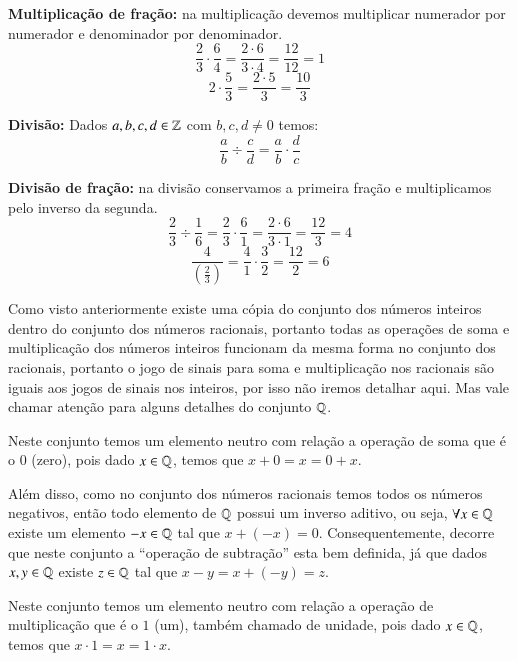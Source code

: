  \vskip0.3cm
 \begin{exem}
  \textbf{Multiplicação de fração:} na multiplicação devemos multiplicar numerador por numerador e denominador por denominador.
   \[\frac{2}{3} \cdot \frac{6}{4}= \frac{2 \cdot 6}{3 \cdot 4}= \frac{12}{12}= 1 \]
   \[2 \cdot \frac{5}{3}= \frac{2 \cdot 5}{3}= \frac{10}{3}\]
 \end{exem}

 \vskip0.3cm

 \colorbox{azul}{
 \begin{minipage}{0.9\linewidth}
 \begin{center}
  \textbf{Divisão:} Dados $a, b, c, d \in \mathbb{Z}$ com $b, c, d \neq 0$ temos:
 \[\frac{a}{b} \div \frac{c}{d}= \frac{a}{b} \cdot \frac{d}{c} \]
 \end{center}
 \end{minipage}}

 \vskip0.3cm
 \begin{exem}
  \textbf{Divisão de fração:} na divisão conservamos a primeira fração e multiplicamos pelo inverso da segunda.
   \[\frac{2}{3} \div \frac{1}{6}= \frac{2}{3} \cdot \frac{6}{1}= \frac{2 \cdot 6}{3 \cdot 1}= \frac{12}{3}= 4 \]
   \[\frac{4}{\left(\frac{2}{3}\right)}= \frac{4}{1} \cdot \frac{3}{2}= \frac{12}{2}=6\]
 \end{exem}

 Como visto anteriormente existe uma cópia do conjunto dos números inteiros dentro do conjunto dos números racionais, portanto todas as operações de soma e multiplicação dos números inteiros funcionam da mesma forma no conjunto dos racionais, portanto o jogo de sinais para soma e multiplicação nos racionais são iguais aos jogos de sinais nos inteiros, por isso não iremos detalhar aqui. Mas vale chamar atenção para alguns detalhes do conjunto $\mathbb{Q}$.
 
   Neste conjunto temos um elemento neutro com relação a operação de soma que é o $0$ (zero), pois dado $x \in \mathbb{Q}$, temos que $x+0= x= 0+x$.
 
 Além disso, como no conjunto dos números racionais temos todos os números negativos, então todo elemento de $\mathbb{Q}$ possui um inverso aditivo, ou seja, $\forall x \in \mathbb{Q}$ existe um elemento $-x \in \mathbb{Q}$ tal que $x + (-x)=0$. Consequentemente, decorre que neste conjunto a ``operação de subtração'' esta bem definida, já que dados $x, y \in \mathbb{Q}$ existe $z \in \mathbb{Q}$ tal que $x - y= x+ (-y)= z$.
 
 Neste conjunto temos um elemento neutro com relação a operação de multiplicação que é o $1$ (um), também chamado de unidade, pois dado $x \in \mathbb{Q}$, temos que $x \cdot 1= x= 1 \cdot x$.

